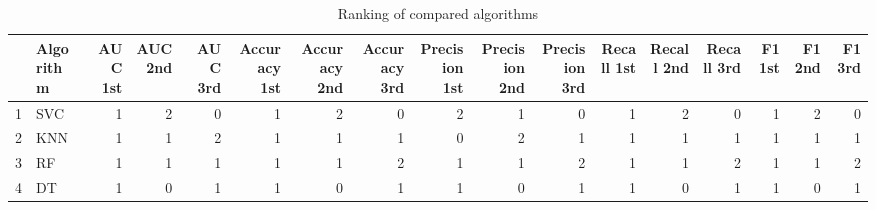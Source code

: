\begin{table}
\footnotesize
\caption{Ranking of compared algorithms}
\label{tab:places}
\begin{tabular}{llrrrrrrrrrrrrrrr}
\hline
 & Algorithm & AUC 1st & AUC 2nd & AUC 3rd & Accuracy 1st & Accuracy 2nd & Accuracy 3rd & Precision 1st & Precision 2nd & Precision 3rd & Recall 1st & Recall 2nd & Recall 3rd & F1 1st & F1 2nd & F1 3rd \\
\hline
1 & SVC & 1 & 2 & 0 & 1 & 2 & 0 & 2 & 1 & 0 & 1 & 2 & 0 & 1 & 2 & 0 \\
2 & KNN & 1 & 1 & 2 & 1 & 1 & 1 & 0 & 2 & 1 & 1 & 1 & 1 & 1 & 1 & 1 \\
3 & RF & 1 & 1 & 1 & 1 & 1 & 2 & 1 & 1 & 2 & 1 & 1 & 2 & 1 & 1 & 2 \\
4 & DT & 1 & 0 & 1 & 1 & 0 & 1 & 1 & 0 & 1 & 1 & 0 & 1 & 1 & 0 & 1 \\
\hline
\end{tabular}
\end{table}
